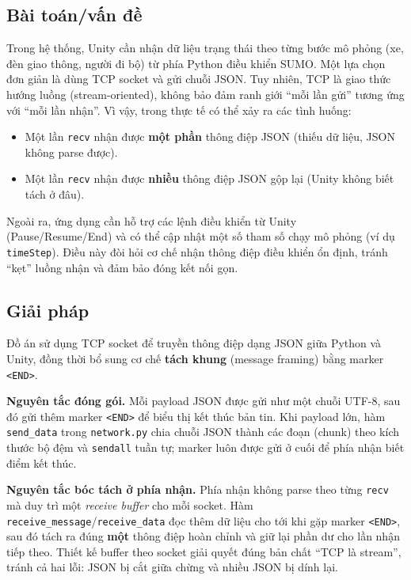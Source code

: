 \documentclass[../DoAn.tex]{subfiles}
\begin{document}
\subsection{Bài toán/vấn đề}
Trong hệ thống, Unity cần nhận dữ liệu trạng thái theo từng bước mô phỏng (xe, đèn giao thông, người đi bộ) từ phía Python điều khiển SUMO. Một lựa chọn đơn giản là dùng TCP socket và gửi chuỗi JSON. Tuy nhiên, TCP là giao thức hướng luồng (stream-oriented), không bảo đảm ranh giới ``mỗi lần gửi'' tương ứng với ``mỗi lần nhận''. Vì vậy, trong thực tế có thể xảy ra các tình huống:
\begin{itemize}[leftmargin=2em]
	\item Một lần \texttt{recv} nhận được \textbf{một phần} thông điệp JSON (thiếu dữ liệu, JSON không parse được).
	\item Một lần \texttt{recv} nhận được \textbf{nhiều} thông điệp JSON gộp lại (Unity không biết tách ở đâu).
\end{itemize}

Ngoài ra, ứng dụng cần hỗ trợ các lệnh điều khiển từ Unity (Pause/Resume/End) và có thể cập nhật một số tham số chạy mô phỏng (ví dụ \texttt{timeStep}). Điều này đòi hỏi cơ chế nhận thông điệp điều khiển ổn định, tránh ``kẹt'' luồng nhận và đảm bảo đóng kết nối gọn.

\subsection{Giải pháp}
Đồ án sử dụng TCP socket để truyền thông điệp dạng JSON giữa Python và Unity, đồng thời bổ sung cơ chế \textbf{tách khung} (message framing) bằng marker \texttt{<END>}.

\textbf{Nguyên tắc đóng gói.} Mỗi payload JSON được gửi như một chuỗi UTF-8, sau đó gửi thêm marker \texttt{<END>} để biểu thị kết thúc bản tin. Khi payload lớn, hàm \texttt{send\_data} trong \texttt{network.py} chia chuỗi JSON thành các đoạn (chunk) theo kích thước bộ đệm và \texttt{sendall} tuần tự; marker luôn được gửi ở cuối để phía nhận biết điểm kết thúc.

\textbf{Nguyên tắc bóc tách ở phía nhận.} Phía nhận không parse theo từng \texttt{recv} mà duy trì một \emph{receive buffer} cho mỗi socket. Hàm \texttt{receive\_message}/\texttt{receive\_data} đọc thêm dữ liệu cho tới khi gặp marker \texttt{<END>}, sau đó tách ra đúng \textbf{một} thông điệp hoàn chỉnh và giữ lại phần dư cho lần nhận tiếp theo. Thiết kế buffer theo socket giải quyết đúng bản chất ``TCP là stream'', tránh cả hai lỗi: JSON bị cắt giữa chừng và nhiều JSON bị dính lại.
\end{document}
